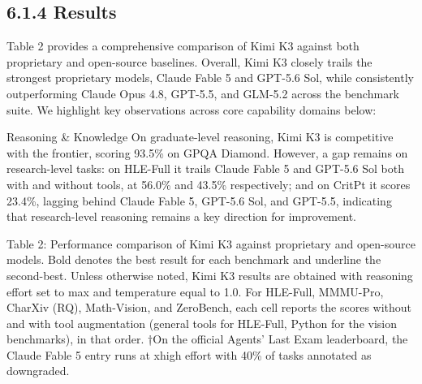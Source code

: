 \documentclass[
  10
]{article}
\begin{document}
\subsection{6.1.4 Results}\label{results}

Table 2 provides a comprehensive comparison of Kimi K3 against both
proprietary and open-source baselines. Overall, Kimi K3 closely trails
the strongest proprietary models, Claude Fable 5 and GPT-5.6 Sol, while
consistently outperforming Claude Opus 4.8, GPT-5.5, and GLM-5.2 across
the benchmark suite. We highlight key observations across core
capability domains below:

Reasoning \& Knowledge On graduate-level reasoning, Kimi K3 is
competitive with the frontier, scoring 93.5\% on GPQA Diamond. However,
a gap remains on research-level tasks: on HLE-Full it trails Claude
Fable 5 and GPT-5.6 Sol both with and without tools, at 56.0\% and
43.5\% respectively; and on CritPt it scores 23.4\%, lagging behind
Claude Fable 5, GPT-5.6 Sol, and GPT-5.5, indicating that research-level
reasoning remains a key direction for improvement.

Table 2: Performance comparison of Kimi K3 against proprietary and
open-source models. Bold denotes the best result for each benchmark and
underline the second-best. Unless otherwise noted, Kimi K3 results are
obtained with reasoning effort set to max and temperature equal to 1.0.
For HLE-Full, MMMU-Pro, CharXiv (RQ), Math-Vision, and ZeroBench, each
cell reports the scores without and with tool augmentation (general
tools for HLE-Full, Python for the vision benchmarks), in that order.
†On the official Agents' Last Exam leaderboard, the Claude Fable 5 entry
runs at xhigh effort with 40\% of tasks annotated as downgraded.
\end{document}
